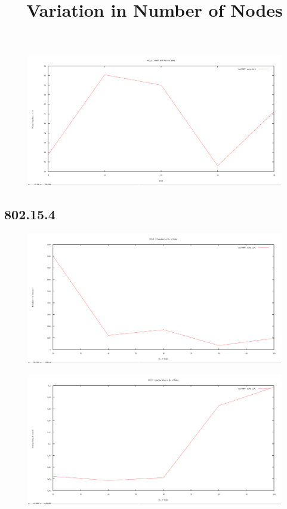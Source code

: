 \documentclass[12pt]{article}
\begin{document}
\begin{figure}[H]
	\centering
	\includegraphics[scale=	0.26]{image/802.11/Packetdropratio_vs_speed.png}
\end{figure}




\newpage
\subsection{802.15.4}

\title{Variation in Number of Nodes}
\begin{figure}[H]
	\centering
	\includegraphics[scale=	0.26]{image/802.15.4/Throughput_vs_nodes.png}
\end{figure}

\begin{figure}[H]
	\centering
	\includegraphics[scale=	0.26]{image/802.15.4/Averagedelay_vs_nodes.png}
\end{figure}
\end{document}
